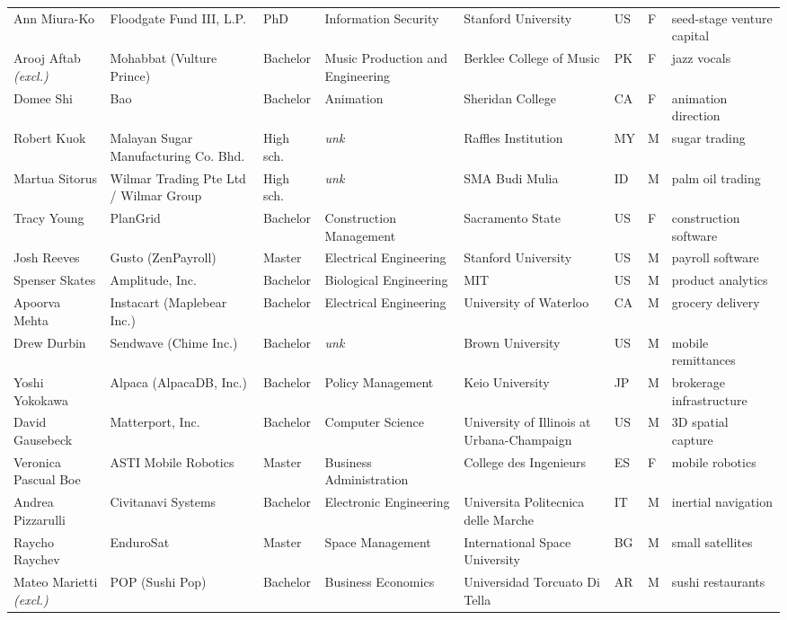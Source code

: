 \documentclass[11pt]{article}
\begin{document}
\begin{longtable}{@{}p{2.4cm}p{2.5cm}p{1.35cm}p{1.9cm}p{2.1cm}p{0.5cm}p{0.45cm}p{2.2cm}@{}}
Ann Miura-Ko & Floodgate Fund III, L.P. & PhD & Information Security & Stanford University & US & F & seed-stage venture capital \\
Arooj Aftab \textit{\scriptsize(excl.)} & Mohabbat (Vulture Prince) & Bachelor & Music Production and Engineering & Berklee College of Music & PK & F & jazz vocals \\
Domee Shi & Bao & Bachelor & Animation & Sheridan College & CA & F & animation direction \\
Robert Kuok & Malayan Sugar Manufacturing Co. Bhd. & High sch. & \textit{unk} & Raffles Institution & MY & M & sugar trading \\
Martua Sitorus & Wilmar Trading Pte Ltd / Wilmar Group & High sch. & \textit{unk} & SMA Budi Mulia & ID & M & palm oil trading \\
Tracy Young & PlanGrid & Bachelor & Construction Management & Sacramento State & US & F & construction software \\
Josh Reeves & Gusto (ZenPayroll) & Master & Electrical Engineering & Stanford University & US & M & payroll software \\
Spenser Skates & Amplitude, Inc. & Bachelor & Biological Engineering & MIT & US & M & product analytics \\
Apoorva Mehta & Instacart (Maplebear Inc.) & Bachelor & Electrical Engineering & University of Waterloo & CA & M & grocery delivery \\
Drew Durbin & Sendwave (Chime Inc.) & Bachelor & \textit{unk} & Brown University & US & M & mobile remittances \\
Yoshi Yokokawa & Alpaca (AlpacaDB, Inc.) & Bachelor & Policy Management & Keio University & JP & M & brokerage infrastructure \\
David Gausebeck & Matterport, Inc. & Bachelor & Computer Science & University of Illinois at Urbana-Champaign & US & M & 3D spatial capture \\
Veronica Pascual Boe & ASTI Mobile Robotics & Master & Business Administration & College des Ingenieurs & ES & F & mobile robotics \\
Andrea Pizzarulli & Civitanavi Systems & Bachelor & Electronic Engineering & Universita Politecnica delle Marche & IT & M & inertial navigation \\
Raycho Raychev & EnduroSat & Master & Space Management & International Space University & BG & M & small satellites \\
Mateo Marietti \textit{\scriptsize(excl.)} & POP (Sushi Pop) & Bachelor & Business Economics & Universidad Torcuato Di Tella & AR & M & sushi restaurants \\

\end{longtable}
\end{document}
